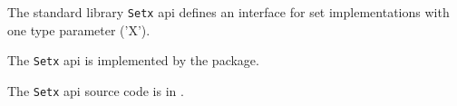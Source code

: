 
The standard library {\tt Setx} api defines an interface for set implementations with one type parameter ('X').

The {\tt Setx} api is implemented by the 
 package.

The {\tt Setx} api source code is in .
